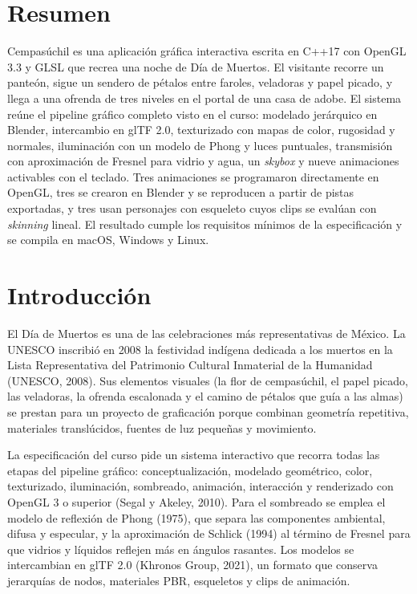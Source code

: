 \documentclass[letter,12pt]{article}
\begin{document}
	\section*{Resumen}
	Cempasúchil es una aplicación gráfica interactiva escrita en C++17 con OpenGL 3.3 y GLSL que recrea una noche de Día de Muertos. El visitante recorre un panteón, sigue un sendero de pétalos entre faroles, veladoras y papel picado, y llega a una ofrenda de tres niveles en el portal de una casa de adobe. El sistema reúne el pipeline gráfico completo visto en el curso: modelado jerárquico en Blender, intercambio en glTF 2.0, texturizado con mapas de color, rugosidad y normales, iluminación con un modelo de Phong y luces puntuales, transmisión con aproximación de Fresnel para vidrio y agua, un \textit{skybox} y nueve animaciones activables con el teclado. Tres animaciones se programaron directamente en OpenGL, tres se crearon en Blender y se reproducen a partir de pistas exportadas, y tres usan personajes con esqueleto cuyos clips se evalúan con \textit{skinning} lineal. El resultado cumple los requisitos mínimos de la especificación y se compila en macOS, Windows y Linux.

	\section{Introducción}
	El Día de Muertos es una de las celebraciones más representativas de México. La UNESCO inscribió en 2008 la festividad indígena dedicada a los muertos en la Lista Representativa del Patrimonio Cultural Inmaterial de la Humanidad (UNESCO, 2008). Sus elementos visuales (la flor de cempasúchil, el papel picado, las veladoras, la ofrenda escalonada y el camino de pétalos que guía a las almas) se prestan para un proyecto de graficación porque combinan geometría repetitiva, materiales translúcidos, fuentes de luz pequeñas y movimiento.

	La especificación del curso pide un sistema interactivo que recorra todas las etapas del pipeline gráfico: conceptualización, modelado geométrico, color, texturizado, iluminación, sombreado, animación, interacción y renderizado con OpenGL 3 o superior (Segal y Akeley, 2010). Para el sombreado se emplea el modelo de reflexión de Phong (1975), que separa las componentes ambiental, difusa y especular, y la aproximación de Schlick (1994) al término de Fresnel para que vidrios y líquidos reflejen más en ángulos rasantes. Los modelos se intercambian en glTF 2.0 (Khronos Group, 2021), un formato que conserva jerarquías de nodos, materiales PBR, esqueletos y clips de animación.
\end{document}
